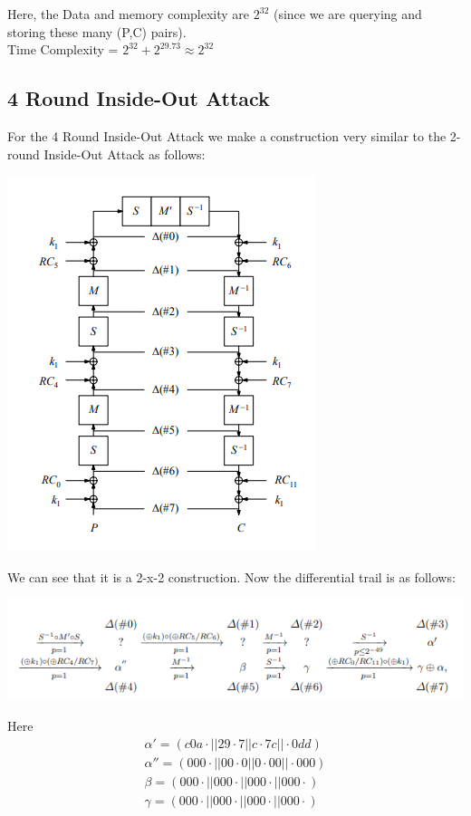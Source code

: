 \documentclass{transcrypto}
\begin{document}
Here, the Data and memory complexity are  $2^{32}$ (since we are querying and storing these many (P,C) pairs). \\
Time Complexity = $2^{32} + 2^{29.73} \approx 2^{32}$
\subsection{4 Round Inside-Out Attack}
For the 4 Round Inside-Out Attack we make a construction very similar to the 2-round Inside-Out Attack as follows:\\
\begin{center}
    \includegraphics[scale=0.5]{image.png}
\end{center}
We can see that it is a 2-x-2 construction. Now the differential trail is as follows:\\
\begin{center}
    \includegraphics[scale=0.6]{pic.png}
\end{center}
Here \\
\begin{align*}
    \alpha ' = (c0a\cdot|| 29\cdot7 || c\cdot7c||\cdot0dd)\\
    \alpha '' = (000\cdot ||00\cdot0||0\cdot00||\cdot000)\\
    \beta=(000\cdot ||000\cdot||000\cdot||000\cdot)\\
    \gamma=(000\cdot||000\cdot||000\cdot||000\cdot)
\end{align*}
\end{document}
